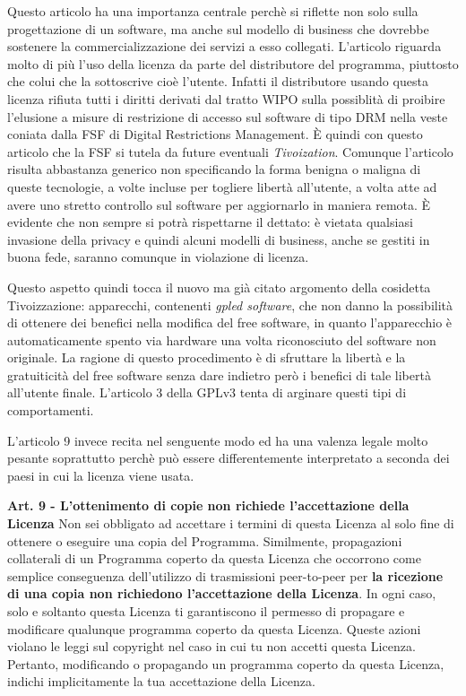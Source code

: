 Questo articolo ha una importanza centrale perchè si riflette non solo sulla progettazione di un software, ma anche sul modello di business che dovrebbe sostenere la commercializzazione dei servizi a esso collegati. L'articolo riguarda molto di più l'uso della licenza da parte del distributore del programma, piuttosto che colui che la sottoscrive cioè l'utente. Infatti il distributore usando questa licenza rifiuta tutti i diritti derivati dal tratto WIPO sulla possiblità di proibire l'elusione a misure di restrizione di accesso sul software di tipo DRM nella veste coniata dalla FSF di Digital Restrictions Management. \`E quindi con questo articolo che la FSF si tutela da future eventuali \textit{Tivoization}. Comunque l'articolo risulta abbastanza generico non specificando la forma benigna o maligna di queste tecnologie, a volte incluse per togliere libertà all'utente, a volta atte ad avere uno stretto controllo sul software per aggiornarlo in maniera remota. \`E evidente che non sempre si potrà rispettarne il dettato: è vietata qualsiasi invasione della privacy e quindi alcuni modelli di business, anche se gestiti in buona fede, saranno comunque in violazione di licenza.

Questo aspetto quindi tocca il nuovo ma già citato argomento della cosidetta Tivoizzazione: apparecchi, contenenti \textit{gpled software}, che non danno la possibilità di ottenere dei benefici nella modifica del free software, in quanto l'apparecchio è automaticamente spento via hardware una volta riconosciuto del software non originale. La ragione di questo procedimento è di sfruttare la libertà e la gratuiticità del free software senza dare indietro però i benefici di tale libertà all'utente finale. L'articolo 3 della GPLv3 tenta di arginare questi tipi di comportamenti.

L'articolo 9 invece recita nel senguente modo ed ha una valenza legale molto pesante soprattutto perchè può essere differentemente interpretato a seconda dei paesi in cui la licenza viene usata.\\


\begin{scriptsize}\textbf{Art. 9 - L'ottenimento di copie non richiede l'accettazione della Licenza}
Non sei obbligato ad accettare i termini di questa Licenza al solo fine di ottenere o eseguire una copia del Programma. Similmente, propagazioni collaterali di un Programma coperto da questa Licenza che occorrono come semplice conseguenza dell'utilizzo di trasmissioni peer-to-peer per \textbf{la ricezione di una copia non richiedono l'accettazione della Licenza}. In ogni caso, solo e soltanto questa Licenza ti garantiscono il permesso di propagare e modificare qualunque programma coperto da questa Licenza. Queste azioni violano le leggi sul copyright nel caso in cui tu non accetti questa Licenza. Pertanto, modificando o propagando un programma coperto da questa Licenza, indichi implicitamente la tua accettazione della Licenza.\\

\end{scriptsize}

